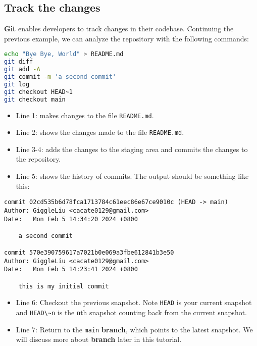 \documentclass[
  notoc %
]{tufte-book}
\providecommand{\tightlist}{%
  \setlength{\itemsep}{0pt}\setlength{\parskip}{0pt}
}
\newcommand{\passthrough}[1]{#1}
\begin{document}
\hypertarget{track-the-changes}{%
\subsection{Track the changes}\label{track-the-changes}}

\textbf{Git} enables developers to track changes in their codebase.
Continuing the previous example, we can analyze the repository with the
following commands:

\begin{lstlisting}[language=bash]
echo "Bye Bye, World" > README.md
git diff
git add -A
git commit -m 'a second commit'
git log
git checkout HEAD~1
git checkout main
\end{lstlisting}

\begin{itemize}
\tightlist
\item
  Line 1: makes changes to the file \passthrough{\lstinline!README.md!}.
\item
  Line 2: shows the changes made to the file
  \passthrough{\lstinline!README.md!}.
\item
  Line 3-4: adds the changes to the staging area and commits the changes
  to the repository.
\item
  Line 5: shows the history of commits. The output should be something
  like this:
\end{itemize}

\begin{lstlisting}
commit 02cd535b6d78fca1713784c61eec86e67ce9010c (HEAD -> main)
Author: GiggleLiu <cacate0129@gmail.com>
Date:   Mon Feb 5 14:34:20 2024 +0800

    a second commit

commit 570e390759617a7021b0e069a3fbe612841b3e50
Author: GiggleLiu <cacate0129@gmail.com>
Date:   Mon Feb 5 14:23:41 2024 +0800

    this is my initial commit
\end{lstlisting}

\begin{itemize}
\tightlist
\item
  Line 6: Checkout the previous snapshot. Note
  \passthrough{\lstinline!HEAD!} is your current snapshot and
  \passthrough{\lstinline!HEAD\~n!} is the \passthrough{\lstinline!n!}th
  snapshot counting back from the current snapshot.
\item
  Line 7: Return to the \passthrough{\lstinline!main!} \textbf{branch},
  which points to the latest snapshot. We will discuss more about
  \textbf{branch} later in this tutorial.
\end{itemize}
\end{document}
